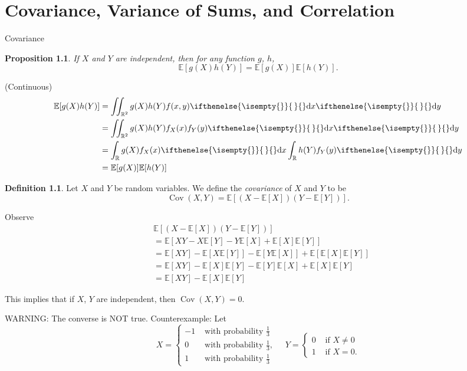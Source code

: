 \documentclass[a4paper,11pt]{amsbook}
\makeatletter
\def\section{\@startsection{section}{2}%
    \z@{1\linespacing\@plus1\linespacing}{.5\linespacing}%
    {\large\normalfont\bfseries\centering\color{darkblue}}}
\renewenvironment{proof}[1][\proofname]{\par
    \pushQED{\qed}%
    \normalfont \topsep6\p@\@plus6\p@\relax
    \trivlist
    \itemindent\z@ %
    \item[\hskip\labelsep
          \scshape
      #1\@addpunct{.}]\ignorespaces
}{%
    \popQED\endtrivlist\@endpefalse
}
\newtheorem{proposition}{\hspace{-2em} \color{darkblue} Proposition}[chapter]
\theoremstyle{definition}
\newtheorem{definition}{\hspace{-2em} \color{darkblue} Definition}[chapter]
\theoremstyle{remark}
\newcommand{\R}{\mathbb{R}}
\newcommand{\E}{\mathbb{E}}
\DeclareMathOperator\Cov{Cov}
\newcommand\0{\varnothing}
\newcommand\dx[1][]{\ifthenelse{\isempty{#1}}{\,}{}\mathrm{d}x}
\newcommand\dy[1][]{\ifthenelse{\isempty{#1}}{\,}{}\mathrm{d}y}
\makeatother
\begin{document}
\chapter{Covariance, Variance of Sums, and Correlation} \label{part::} %

\section{Covariance} \label{sec::covariance} %

    \begin{proposition}
        If $X$ and $Y$ are independent, then for any function $g$, $h$, $$\E[g(X)h(Y)]=\E[g(X)]\E[h(Y)].$$
    \end{proposition}
    \begin{proof}
        (Continuous) \begin{align*}
            \E[g(X)h(Y)]&=\iint_{\R^2}g(X)h(Y)f(x,y)\dx\dy \\
            &=\iint_{\R^2}g(X)h(Y)f_X(x)f_Y(y)\dx\dy \\
            &=\int_{\R}g(X)f_X(x)\dx\int_{\R}h(Y)f_Y(y)\dy \\
            &=\E[g(X)]\E[h(Y)]
        \end{align*}
    \end{proof}

    \begin{definition}
        Let $X$ and $Y$ be random variables.
        We define the \emph{covariance} of $X$ and $Y$ to be $$\Cov(X,Y)=\E[(X-\E[X])(Y-\E[Y])].$$
    \end{definition}
    Observe \begin{align*}
        &\E[(X-\E[X])(Y-\E[Y])] \\
        &=\E[XY-X\E[Y]-Y\E[X]+\E[X]\E[Y]] \\
        &=\E[XY]-\E[X\E[Y]]-\E[Y\E[X]]+\E[\E[X]\E[Y]] \\
        &=\E[XY]-\E[X]\E[Y]-\E[Y]\E[X]+\E[X]\E[Y] \\
        &=\E[XY]-\E[X]\E[Y]
    \end{align*}

    This implies that if $X$, $Y$ are independent, then $\Cov(X,Y)=0$.

    WARNING: The converse is NOT true. Counterexample: Let $$X=\begin{cases}
        -1 & \text{ with probability }\frac{1}{3} \\[10pt]
        0 & \text{ with probability }\frac{1}{3}, \\[10pt]
        1 & \text{ with probability }\frac{1}{3}
    \end{cases}\quad Y=\begin{cases}
        0 & \text{ if }X\neq0 \\
        1 & \text{ if }X=0.
    \end{cases}$$
\end{document}
